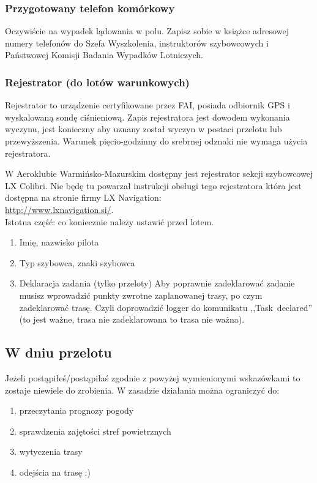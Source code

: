 \documentclass{article}
\begin{document}
\subsubsection{Przygotowany telefon komórkowy}
Oczywiście na wypadek lądowania w polu. Zapisz sobie w książce adresowej
numery telefonów do Szefa Wyszkolenia, instruktorów szybowcowych i 
Państwowej Komisji Badania Wypadków Lotniczych.

\subsubsection{Rejestrator (do lotów warunkowych)}
Rejestrator to urządzenie certyfikowane przez FAI, posiada odbiornik
GPS i wyskalowaną sondę ciśnieniową. Zapis rejestratora jest dowodem
wykonania wyczynu, jest konieczny aby uznany został
wyczyn w postaci przelotu lub przewyższenia. Warunek pięcio-godzinny
do srebrnej odznaki nie wymaga użycia rejestratora.

W Aeroklubie Warmińsko-Mazurskim dostępny
jest rejestrator sekcji szybowcowej LX Colibri. Nie będę tu powarzał
instrukcji obsługi tego rejestratora która jest dostępna na stronie
firmy LX Navigation: \\
\url{http://www.lxnavigation.si/}. \\

\noindent
Istotna część: co koniecznie należy ustawić przed lotem.
\begin{enumerate}
\item Imię, nazwisko pilota
\item Typ szybowca, znaki szybowca
\item Deklaracja zadania (tylko przeloty)
    Aby poprawnie zadeklarować zadanie musisz wprowadzić punkty zwrotne
    zaplanowanej trasy, po czym zadeklarować trasę. Czyli doprowadzić
    logger do komunikatu ,,Task~declared'' (to jest ważne, trasa nie
    zadeklarowana to trasa nie ważna).
\end{enumerate}

\subsection{W dniu przelotu}
Jeżeli postąpiłeś/postąpiłaś zgodnie z powyżej wymienionymi wskazówkami to
zostaje niewiele do zrobienia. W zasadzie działania można ograniczyć do:
\begin{enumerate}
\item przeczytania prognozy pogody
\item sprawdzenia zajętości stref powietrznych
\item wytyczenia trasy
\item odejścia na trasę :)
\end{enumerate}
\end{document}

